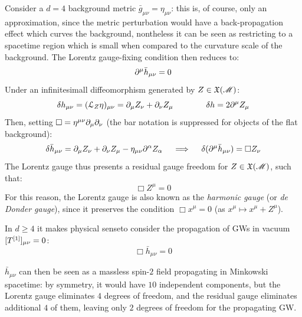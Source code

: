 Consider a $ d = 4 $ background metric $ \bar{g}_{\mu \nu} = \eta_{\mu \nu} $: this is, of course, only an approximation, since the metric perturbation would have a back-propagation effect which curves the background, nontheless it can be seen as restricting to a spacetime region which is small when compared to the curvature scale of the background. The Lorentz gauge-fixing condition then reduces to:
\begin{equation*}
  \partial^\mu \bar{h}_{\mu \nu} = 0
\end{equation*}
Under an infinitesimall diffeomorphism generated by $ Z \in \mathfrak{X}(\mathscr{M}) $:
\begin{equation*}
  \delta h_{\mu \nu} = (\EuScript{L}_Z \eta)_{\mu \nu} = \partial_\mu Z_\nu + \partial_\nu Z_\mu
  \qquad \qquad
  \delta h = 2 \partial^\mu Z_\mu
\end{equation*}
Then, setting $ \Box = \eta^{\mu \nu} \partial_\mu \partial_\nu $ (the bar notation is suppressed for objects of the flat background):
\begin{equation*}
  \delta \bar{h}_{\mu \nu} = \partial_\mu Z_\nu + \partial_\nu Z_\mu - \eta_{\mu \nu} \partial^\alpha Z_\alpha
  \quad \implies \quad
  \delta (\partial^\mu \bar{h}_{\mu \nu}) = \Box Z_\nu
\end{equation*}
The Lorentz gauge thus presents a residual gauge freedom for $ Z \in \mathfrak{X}(\mathscr{M}) $, such that:
\begin{equation}
  \Box Z^\mu = 0
\end{equation}
For this reason, the Lorentz gauge is also known as the \emph{harmonic gauge} (or \emph{de Donder gauge}), since it preserves the condition $ \Box x^\mu = 0 $ (as $ x^\mu \mapsto x^\mu + Z^\mu $).

In $ d \ge 4 $ it makes physical sense\footnotemark to consider the propagation of GWs in vacuum $ [T^{[1]}]_{\mu \nu} = 0 $:
\begin{equation}
  \Box \bar{h}_{\mu \nu} = 0
  \label{eq:vacuum-gw}
\end{equation}


$ \bar{h}_{\mu \nu} $ can then be seen as a massless spin-$ 2 $ field propagating in Minkowski spacetime: by symmetry, it would have $ 10 $ independent components, but the Lorentz gauge eliminates $ 4 $ degrees of freedom, and the residual gauge eliminates additional $ 4 $ of them, leaving only $ 2 $ degrees of freedom for the propagating GW.

